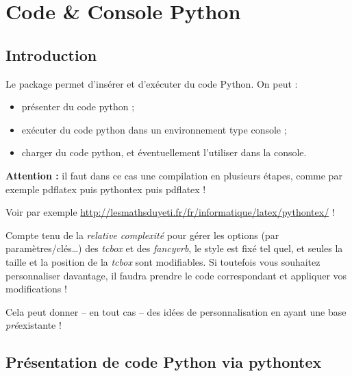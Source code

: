 \documentclass{article}
\newcommand\ctex[1]{\tcbox[vignettelatex]{#1}}
\begin{document}
\newpage

\section{Code \& Console Python}

\subsection{Introduction}

\begin{codeidee}
Le {package} \ctex{pythontex} permet d'insérer et d'exécuter du code Python. On peut :

\begin{itemize}
	\item présenter du code python ;
	\item exécuter du code python dans un environnement type \og console \fg{} ;
	\item charger du code python, et éventuellement l'utiliser dans la console.
\end{itemize}
\end{codeidee}

\smallskip

\begin{codeinfo}
\textbf{Attention : }il faut dans ce cas une compilation en plusieurs étapes, comme par exemple \textsf{pdflatex puis pythontex puis pdflatex} !

Voir par exemple \url{http://lesmathsduyeti.fr/fr/informatique/latex/pythontex/} !
\end{codeinfo}

\smallskip

\begin{codeinfo}
Compte tenu de la \textit{relative complexité} pour gérer les options (par paramètres/clés\ldots) des \textit{tcbox} et des \textit{fancyvrb}, le style est \og fixé \fg{} tel quel, et seules la taille et la position de la \textit{tcbox} sont modifiables. Si toutefois vous souhaitez personnaliser davantage, il faudra prendre le code correspondant et appliquer vos modifications !

Cela peut donner -- en tout cas -- des idées de personnalisation en ayant une base \textit{pré}existante !
\end{codeinfo}

\subsection{Présentation de code Python via pythontex}
\end{document}
